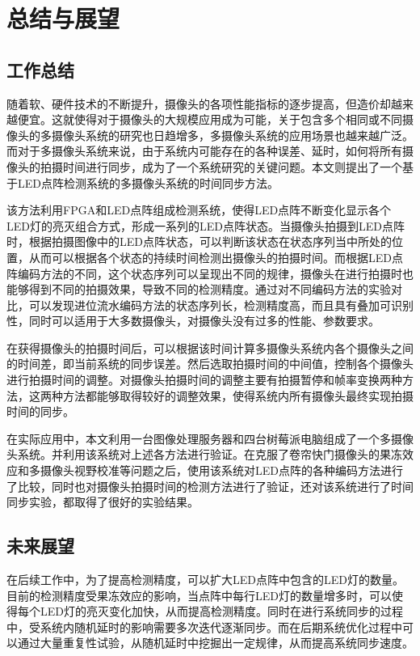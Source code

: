 \chapter{总结与展望}

\section{工作总结}

随着软、硬件技术的不断提升，摄像头的各项性能指标的逐步提高，但造价却越来越便宜。这就使得对于摄像头的大规模应用成为可能，关于包含多个相同或不同摄像头的多摄像头系统的研究也日趋增多，多摄像头系统的应用场景也越来越广泛。而对于多摄像头系统来说，由于系统内可能存在的各种误差、延时，如何将所有摄像头的拍摄时间进行同步，成为了一个系统研究的关键问题。本文则提出了一个基于LED点阵检测系统的多摄像头系统的时间同步方法。

该方法利用FPGA和LED点阵组成检测系统，使得LED点阵不断变化显示各个LED灯的亮灭组合方式，形成一系列的LED点阵状态。当摄像头拍摄到LED点阵时，根据拍摄图像中的LED点阵状态，可以判断该状态在状态序列当中所处的位置，从而可以根据各个状态的持续时间检测出摄像头的拍摄时间。而根据LED点阵编码方法的不同，这个状态序列可以呈现出不同的规律，摄像头在进行拍摄时也能够得到不同的拍摄效果，导致不同的检测精度。通过对不同编码方法的实验对比，可以发现进位流水编码方法的状态序列长，检测精度高，而且具有叠加可识别性，同时可以适用于大多数摄像头，对摄像头没有过多的性能、参数要求。

在获得摄像头的拍摄时间后，可以根据该时间计算多摄像头系统内各个摄像头之间的时间差，即当前系统的同步误差。然后选取拍摄时间的中间值，控制各个摄像头进行拍摄时间的调整。对摄像头拍摄时间的调整主要有拍摄暂停和帧率变换两种方法，这两种方法都能够取得较好的调整效果，使得系统内所有摄像头最终实现拍摄时间的同步。

在实际应用中，本文利用一台图像处理服务器和四台树莓派电脑组成了一个多摄像头系统。并利用该系统对上述各方法进行验证。在克服了卷帘快门摄像头的果冻效应和多摄像头视野校准等问题之后，使用该系统对LED点阵的各种编码方法进行了比较，同时也对摄像头拍摄时间的检测方法进行了验证，还对该系统进行了时间同步实验，都取得了很好的实验结果。

\section{未来展望}

在后续工作中，为了提高检测精度，可以扩大LED点阵中包含的LED灯的数量。目前的检测精度受果冻效应的影响，当点阵中每行LED灯的数量增多时，可以使得每个LED灯的亮灭变化加快，从而提高检测精度。同时在进行系统同步的过程中，受系统内随机延时的影响需要多次迭代逐渐同步。而在后期系统优化过程中可以通过大量重复性试验，从随机延时中挖掘出一定规律，从而提高系统同步速度。
